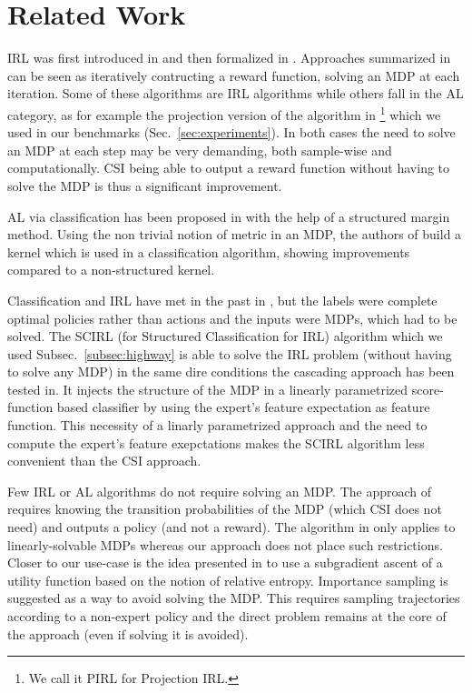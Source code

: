 \documentclass[smallextended]{svjour3}
\begin{document}
\section{Related Work}
\label{sec:related}
IRL was first introduced in \cite{russell1998learning} and then formalized in \cite{ng2000algorithms}. Approaches summarized in \cite{neu2009training} can be seen as iteratively contructing a reward function, solving an MDP at each iteration. Some of these algorithms are IRL algorithms while others fall in the AL category, as for example the projection version of the algorithm in \cite{abbeel2004apprenticeship}\footnote{We call it PIRL for Projection IRL.} which we used in our benchmarks (Sec.~\ref{sec:experiments}). In both cases the need to solve an MDP at each step may be very demanding, both sample-wise and computationally. CSI being able to output a reward function without having to solve the MDP is thus a significant improvement.

AL via classification has been proposed in \cite{ratliff2007imitation} with the help of a structured margin method. Using the non trivial notion of metric in an MDP, the authors of \cite{melo2010learning} build a kernel which is used
in a classification algorithm, showing improvements compared to a
non-structured kernel.

Classification and IRL have met in the past in \cite{ratliff2006maximum}, but the labels were complete optimal policies rather than actions and the inputs were MDPs, which had to be solved. The SCIRL (for Structured Classification for IRL) algorithm \cite{klein2012scirl} which we used Subsec.~\ref{subsec:highway} is able to solve the IRL problem (without having to solve any MDP) in the same dire conditions the cascading approach has been tested in. It injects the structure of the MDP in a linearly parametrized score-function based classifier by using the expert's feature expectation as feature function. This necessity of a linarly parametrized approach and the need to compute the expert's feature exepctations makes the SCIRL algorithm less convenient than the CSI approach.

Few IRL or AL algorithms do not require solving an MDP. The approach of \cite{syed2008apprenticeship} requires knowing the transition probabilities of the MDP (which CSI does not need) and outputs a policy (and not a reward). The algorithm in \cite{dvijotham2010inverse} only applies to linearly-solvable MDPs whereas our approach does not place such restrictions. Closer to our use-case is the idea presented in \cite{boularias2011relative} to use a subgradient ascent of a utility function based on the notion of relative entropy. Importance sampling is suggested as a way to avoid solving the MDP. This requires sampling trajectories according to a non-expert policy and
the direct problem remains at the core of the approach (even if
solving it is avoided).
\end{document}
